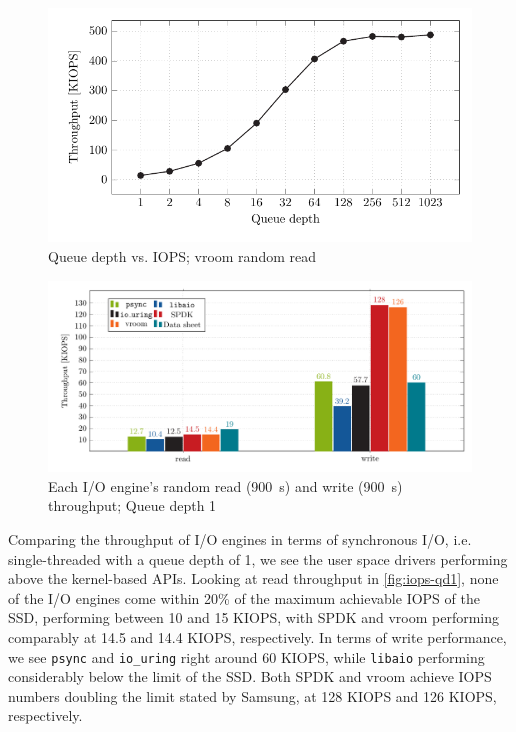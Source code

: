 \begin{figure}[H]
  \centering
  \includegraphics[width=\textwidth]{figures/vroom-iops-qd}
  \caption{Queue depth vs. IOPS; vroom random read}
  \label{fig:vroom-iops-qd}
\end{figure}


\begin{figure}[H]
  \centering
    \includegraphics[width=\textwidth]{figures/iops-qd1-ybar}
    \caption{Each I/O engine's random read (\qty{900}{\second}) and write (\qty{900}{\second}) throughput; Queue depth 1}
    \label{fig:iops-qd1}
\end{figure}

Comparing the throughput of I/O engines in terms of synchronous I/O, i.e. single-threaded with a queue depth of 1, we see the user space drivers performing above the kernel-based APIs. Looking at read throughput in \autoref{fig:iops-qd1}, none of the I/O engines come within 20\% of the maximum achievable IOPS of the SSD, performing between 10 and 15 KIOPS, with SPDK and vroom performing comparably at 14.5 and 14.4 KIOPS, respectively. In terms of write performance, we see \texttt{psync} and \texttt{io\_uring} right around 60 KIOPS, while \texttt{libaio} performing considerably below the limit of the SSD. Both SPDK and vroom achieve IOPS numbers doubling the limit stated by Samsung, at 128 KIOPS and 126 KIOPS, respectively.

